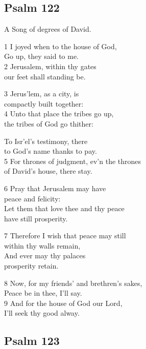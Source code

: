 \begin{center}
\quad{}\quad{}
\end{center}

\subsection*{Psalm 122}

A Song of degrees of David.

1 I joyed when to the house of God,\\
Go up, they said to me.\\
2 Jerusalem, within thy gates\\
our feet shall standing be.

3 Jerus’lem, as a city, is\\
compactly built together:\\
4 Unto that place the tribes go up,\\
the tribes of God go thither:

To Isr’el’s testimony, there\\
to God’s name thanks to pay.\\
5 For thrones of judgment, ev’n the thrones\\
of David’s house, there stay.

6 Pray that Jerusalem may have\\
peace and felicity:\\
Let them that love thee and thy peace\\
have still prosperity.

7 Therefore I wish that peace may still\\
within thy walls remain,\\
And ever may thy palaces\\
prosperity retain.

8 Now, for my friends’ and brethren’s sakes,\\
Peace be in thee, I’ll say.\\
9 And for the house of God our Lord,\\
I’ll seek thy good alway.

\begin{center}
\quad{}\quad{}
\end{center}

\subsection*{Psalm 123}

